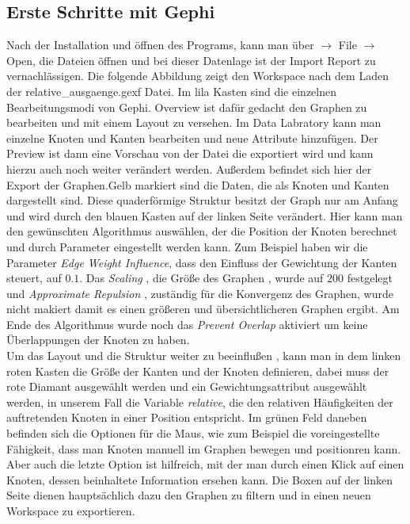 \subsection*{Erste Schritte mit Gephi}
Nach der Installation und öffnen des Programs, kann man über $ \rightarrow $ File $ \rightarrow $ Open, die Dateien öffnen und bei dieser Datenlage ist der Import Report zu vernachlässigen. Die folgende Abbildung zeigt den Workspace nach dem Laden der relative\_ausgaenge.gexf Datei. Im lila Kasten sind die einzelnen Bearbeitungsmodi von Gephi. Overview ist dafür gedacht den Graphen zu bearbeiten und mit einem Layout zu versehen. Im Data Labratory kann man einzelne Knoten und Kanten bearbeiten und neue Attribute hinzufügen. Der Preview ist dann eine Vorschau von der Datei die exportiert wird und kann hierzu auch noch weiter verändert werden. Außerdem befindet sich hier der Export der Graphen.Gelb markiert sind die Daten, die als Knoten und Kanten dargestellt sind. Diese quaderförmige Struktur besitzt der Graph nur am Anfang und wird durch den blauen Kasten auf der linken Seite verändert. Hier kann man den gewünschten Algorithmus auswählen, der die Position der Knoten berechnet und durch Parameter eingestellt werden kann. Zum Beispiel haben wir die Parameter \textit{Edge Weight Influence}, dass den Einfluss der Gewichtung der Kanten steuert, auf $ 0.1 $. Das \textit{Scaling} , die Größe des Graphen , wurde auf $ 200 $ festgelegt und \textit{Approximate Repulsion} , zuständig für die Konvergenz des Graphen, wurde nicht makiert damit es einen größeren und übersichtlicheren Graphen ergibt. Am Ende des Algorithmus wurde noch das \textit{Prevent Overlap} aktiviert um keine Überlappungen der Knoten zu haben. \\
Um das Layout und die Struktur weiter zu beeinflußen , kann man in dem linken roten Kasten die Größe der Kanten und der Knoten definieren, dabei muss der rote Diamant ausgewählt werden und ein Gewichtungsattribut ausgewählt werden, in unserem Fall die Variable \textit{relative}, die den relativen Häufigkeiten der auftretenden Knoten in einer Position entspricht. Im grünen Feld daneben befinden sich die Optionen für die Maus, wie zum Beispiel die voreingestellte Fähigkeit, dass man Knoten manuell im Graphen bewegen und positionren kann. Aber auch die letzte Option ist hilfreich, mit der man durch einen Klick auf einen Knoten, dessen beinhaltete Information ersehen kann. Die Boxen auf der linken Seite dienen hauptsächlich dazu den Graphen zu filtern und in einen neuen Workspace zu exportieren.\\

